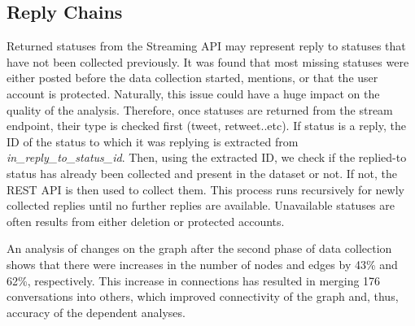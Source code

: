 \documentclass[sigconf]{acmart}
\begin{document}
\subsection{Reply Chains}

Returned statuses from the Streaming API may represent reply to
statuses that have not been collected previously. It was found that
most missing statuses were either posted before the data collection
started, mentions, or that the user account is protected. Naturally,
this issue could have a huge impact on the quality of the analysis. 
Therefore, once statuses are returned from the stream endpoint, 
their type is checked first (tweet, retweet..etc). If status is a reply, 
the ID of the status to which it was replying is extracted from 
{\emph{in\_reply\_to\_status\_id}}. Then, using the extracted ID, we 
check if the replied-to status has already been collected and present 
in the dataset or not. If not, the REST API is then used to collect 
them. This process runs recursively for newly collected replies until 
no further replies are available. Unavailable statuses are often 
results from either deletion or protected accounts.

An analysis of changes on the graph after the second phase of data
collection shows that there were increases in the number of nodes and
edges by 43\% and 62\%, respectively. This increase in connections has
resulted in merging 176 conversations into others, which improved
connectivity of the graph and, thus, accuracy of the dependent
analyses.

\end{document}
